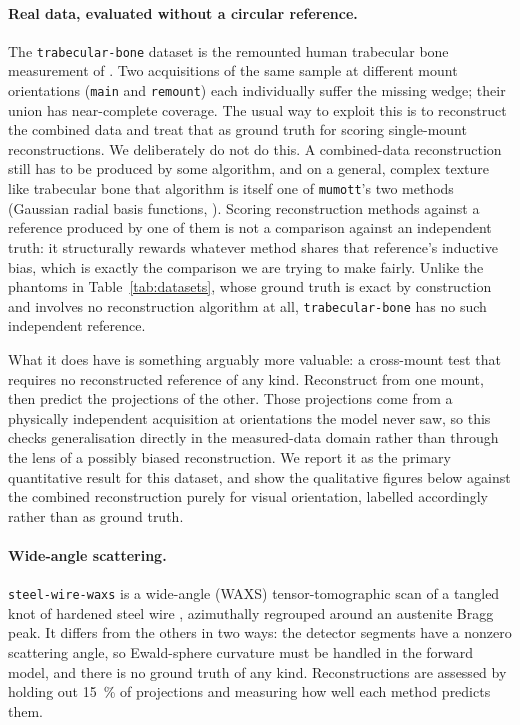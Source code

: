 \documentclass[11pt,a4paper]{article}
\begin{document}
\paragraph{Real data, evaluated without a circular reference.}
The \texttt{trabecular-bone} dataset is the remounted human trabecular bone measurement of
\citet{Nielsen2024}. Two acquisitions of the same sample at different mount orientations
(\texttt{main} and \texttt{remount}) each individually suffer the missing wedge; their
union has near-complete coverage. The usual way to exploit this is to reconstruct the
combined data and treat that as ground truth for scoring single-mount reconstructions.
We deliberately do not do this. A combined-data reconstruction still has to be produced by
some algorithm, and on a general, complex texture like trabecular bone that algorithm is
itself one of \texttt{mumott}'s two methods (Gaussian radial basis functions,
\citealp{Nielsen2023}). Scoring reconstruction methods against a reference produced by one
of them is not a comparison against an independent truth: it structurally rewards whatever
method shares that reference's inductive bias, which is exactly the comparison we are
trying to make fairly. Unlike the phantoms in Table~\ref{tab:datasets}, whose ground truth
is exact by construction and involves no reconstruction algorithm at all,
\texttt{trabecular-bone} has no such independent reference.

What it does have is something arguably more valuable: a cross-mount test that requires no
reconstructed reference of any kind. Reconstruct from one mount, then predict the
projections of the other. Those projections come from a physically independent acquisition
at orientations the model never saw, so this checks generalisation directly in the
measured-data domain rather than through the lens of a possibly biased reconstruction. We
report it as the primary quantitative result for this dataset, and show the qualitative
figures below against the combined reconstruction purely for visual orientation, labelled
accordingly rather than as ground truth.

\paragraph{Wide-angle scattering.}
\texttt{steel-wire-waxs} is a wide-angle (WAXS) tensor-tomographic scan of a tangled knot
of hardened steel wire \citep{Carlsen2024}, azimuthally regrouped around an austenite
Bragg peak. It differs
from the others in two ways: the detector segments have a nonzero scattering angle, so
Ewald-sphere curvature must be handled in the forward model, and there is no ground truth
of any kind. Reconstructions are assessed by holding out \SI{15}{\percent} of projections
and measuring how well each method predicts them.
\end{document}
